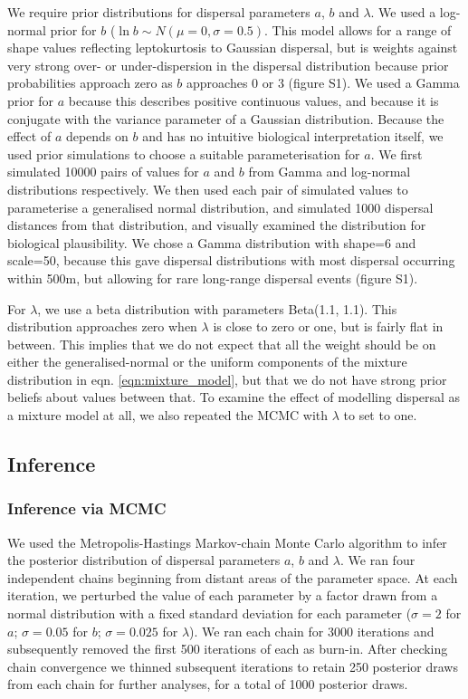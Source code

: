 \documentclass[10pt, a4paper, twocolumn]{article} %
\begin{document}
We require prior distributions for dispersal parameters $a$, $b$ and $\lambda$.
We used a log-normal prior for $b$ ($\ln b \sim N(\mu=0, \sigma = 0.5)$.
This model allows for a range of shape values reflecting leptokurtosis to Gaussian dispersal, but is weights against very strong over- or under-dispersion in the dispersal distribution because prior probabilities approach zero as $b$ approaches 0 or 3 (figure S1).
We used a Gamma prior for $a$ because this describes positive continuous values, and because it is conjugate with the variance parameter of a Gaussian distribution.
Because the effect of $a$ depends on $b$ and has no intuitive biological interpretation itself, we used prior simulations to choose a suitable parameterisation for $a$. We first simulated 10000 pairs of values for $a$ and $b$ from Gamma and log-normal distributions respectively. We then used each pair of simulated values to parameterise a generalised normal distribution, and simulated 1000 dispersal distances from that distribution, and visually examined the distribution for biological plausibility. We chose a Gamma distribution with shape=6 and scale=50, because this gave dispersal distributions with most dispersal occurring within 500m, but allowing for rare long-range dispersal events (figure S1).

For $\lambda$, we use a beta distribution with parameters Beta(1.1, 1.1).
This distribution approaches zero when $\lambda$ is close to zero or one, but is fairly flat in between.
This implies that we do not expect that all the weight should be on either the generalised-normal or the uniform components of the mixture distribution in eqn. \ref{eqn:mixture_model}, but that we do not have strong prior beliefs about values between that.
To examine the effect of modelling dispersal as a mixture model at all, we also repeated the MCMC with $\lambda$ to set to one.

\subsection{Inference}

\subsubsection{Inference via MCMC}

We used the Metropolis-Hastings Markov-chain Monte Carlo algorithm to infer the posterior distribution of dispersal parameters $a$, $b$ and $\lambda$.
We ran four independent chains beginning from distant areas of the parameter space.
At each iteration, we perturbed the value of each parameter by a factor drawn from a normal distribution with a fixed standard deviation for each parameter ($\sigma= 2$ for $a$; $\sigma= 0.05$ for $b$; $\sigma= 0.025$ for $\lambda$).
We ran each chain for 3000 iterations and subsequently removed the first 500 iterations of each as burn-in.
After checking chain convergence we thinned subsequent iterations to retain 250 posterior draws from each chain for further analyses, for a total of 1000 posterior draws.
\end{document}
